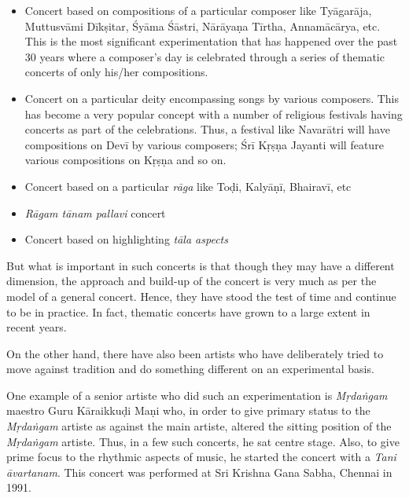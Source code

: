\begin{itemize}
\itemsep=0pt
\item Concert based on compositions of a particular composer like Tyāgarāja, Muttusvāmi Dīkṣitar, Śyāma Śāstri, Nārāyaṇa Tīrtha, Annamācārya, etc. This is the most significant experimentation that has happened over the past 30 years where a composer’s day is celebrated through a series of thematic concerts of only his/her compositions.

 \item Concert on a particular deity encompassing songs by various composers. This has become a very popular concept with a number of religious festivals having concerts as part of the celebrations. Thus, a festival like Navarātri will have compositions on Devī by various composers; Śrī Kṛṣṇa Jayanti will feature various compositions on Kṛṣṇa and so on.

 \item Concert based on a particular \textit{rāga} like Toḍi, Kalyāṇī, Bhairavī, etc

 \item \textit{Rāgam tānam pallavi} concert

 \item Concert based on highlighting \textit{tāla aspects}

\end{itemize}

But what is important in such concerts is that though they may have a different dimension, the approach and build-up of the concert is very much as per the model of a general concert. Hence, they have stood the test of time and continue to be in practice. In fact, thematic concerts have grown to a large extent in recent years.

On the other hand, there have also been artists who have deliberately tried to move against tradition and do something different on an experimental basis.

One example of a senior artiste who did such an experimentation is \textit{Mṛdaṅgam} maestro Guru Kāraikkuḍi Maṇi who, in order to give primary status to the \textit{Mṛdaṅgam} artiste as against the main artiste, altered the sitting position of the \textit{Mṛdaṅgam} artiste. Thus, in a few such concerts, he sat centre stage. Also, to give prime focus to the rhythmic aspects of music, he started the concert with a \textit{Tani āvartanam}. This concert was performed at Sri Krishna Gana Sabha, Chennai in 1991.

